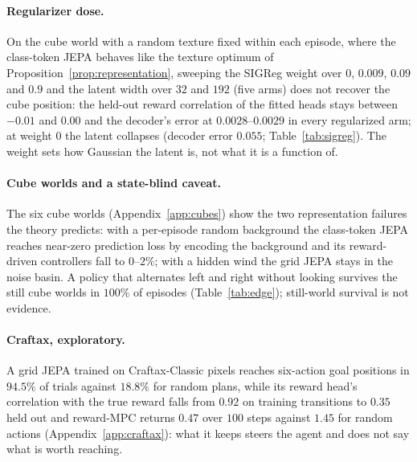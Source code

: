 \paragraph{Regularizer dose.} On the cube world with a random texture fixed within each episode,
where the class-token JEPA behaves like the texture optimum of Proposition~\ref{prop:representation},
sweeping the SIGReg weight over $0$, $0.009$, $0.09$ and $0.9$ and the latent width over $32$ and $192$ (five arms) does not recover the cube position: the held-out reward correlation of the fitted heads stays between $-0.01$ and $0.00$ and the decoder's error at $0.0028$--$0.0029$ in every regularized arm; at weight $0$ the latent collapses (decoder error $0.055$; Table~\ref{tab:sigreg}). The weight sets how Gaussian the latent is, not what it is a function of.

\paragraph{Cube worlds and a state-blind caveat.} The six cube worlds (Appendix~\ref{app:cubes}) show
the two representation failures the theory predicts: with a per-episode random background the class-token JEPA reaches near-zero prediction loss by encoding the background and its reward-driven controllers fall to $0$--$2\%$; with a hidden wind the grid JEPA stays in the noise basin. A policy
that alternates left and right without looking survives the still cube worlds in $100\%$ of episodes (Table~\ref{tab:edge}); still-world survival is not evidence.

\paragraph{Craftax, exploratory.} A grid JEPA trained on Craftax-Classic pixels reaches six-action goal
positions in $94.5\%$ of trials against $18.8\%$ for random plans, while its reward head's correlation with the true reward falls from $0.92$ on training transitions to $0.35$ held out and reward-MPC returns $0.47$ over $100$ steps against $1.45$ for random actions (Appendix~\ref{app:craftax}): what it keeps steers the agent and does not say what is worth reaching.
